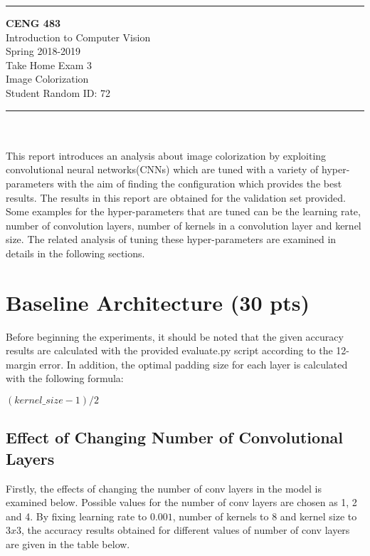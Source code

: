 \documentclass[12pt]{article}
\newcommand{\HRule}{\rule{\linewidth}{1mm}}
\begin{document}
\noindent
\HRule %
\small
\begin{center}
	\LARGE \textbf{CENG 483} \\[4mm]
	\Large Introduction to Computer Vision \\[4mm]
	\normalsize Spring 2018-2019 \\
	\Large Take Home Exam 3 \\
	\Large Image Colorization \\
    \Large Student Random ID: 72 \\
\end{center}
\HRule

\begin{center}
\end{center}
\vspace{-10mm}
\noindent\\ \\ 
This report introduces an analysis about image colorization by exploiting convolutional neural networks(CNNs) which are tuned with a variety of hyper-parameters with the aim of finding the configuration which provides the best results. The results in this report are obtained for the validation set provided. Some examples for the hyper-parameters that are tuned can be the learning rate, number of convolution layers, number of kernels in a convolution layer and kernel size. The related analysis of tuning these hyper-parameters are examined in details in the following sections.

\section{Baseline Architecture (30 pts)}
Before beginning the experiments, it should be noted that the given accuracy results are calculated with the provided evaluate.py script according to the 12-margin error. In addition, the optimal padding size for each layer is calculated with the following formula:

$(kernel\_size - 1) / 2$

\subsection{Effect of Changing Number of Convolutional Layers}\label{AA}

Firstly, the effects of changing the number of conv layers in the model is examined below. Possible values for the number of conv layers are chosen as 1, 2 and 4. By fixing learning rate to $0.001$, number of kernels to $8$ and kernel size to $3x3$, the accuracy results obtained for different values of number of conv layers are given in the table below.
\end{document}
